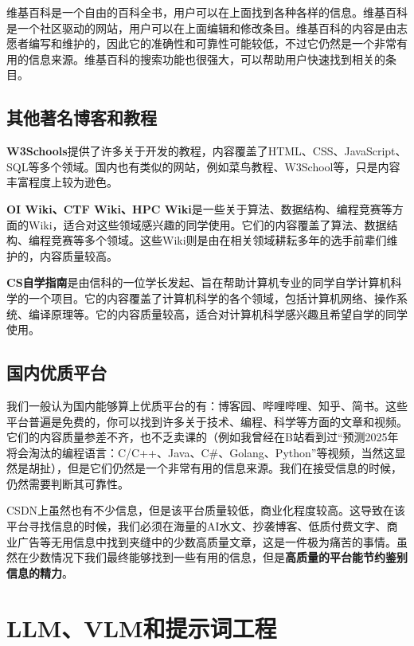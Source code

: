 \documentclass[../main.tex]{subfiles}
\begin{document}
维基百科是一个自由的百科全书，用户可以在上面找到各种各样的信息。维基百科是一个社区驱动的网站，用户可以在上面编辑和修改条目。维基百科的内容是由志愿者编写和维护的，因此它的准确性和可靠性可能较低，不过它仍然是一个非常有用的信息来源。维基百科的搜索功能也很强大，可以帮助用户快速找到相关的条目。

\subsection{其他著名博客和教程}

\textbf{W3Schools}提供了许多关于开发的教程，内容覆盖了HTML、CSS、JavaScript、SQL等多个领域。国内也有类似的网站，例如菜鸟教程、W3School等，只是内容丰富程度上较为逊色。

\textbf{OI Wiki、CTF Wiki、HPC Wiki}是一些关于算法、数据结构、编程竞赛等方面的Wiki，适合对这些领域感兴趣的同学使用。它们的内容覆盖了算法、数据结构、编程竞赛等多个领域。这些Wiki则是由在相关领域耕耘多年的选手前辈们维护的，内容质量较高。

\textbf{CS自学指南}是由信科的一位学长发起、旨在帮助计算机专业的同学自学计算机科学的一个项目。它的内容覆盖了计算机科学的各个领域，包括计算机网络、操作系统、编译原理等。它的内容质量较高，适合对计算机科学感兴趣且希望自学的同学使用。

\subsection{国内优质平台}

我们一般认为国内能够算上优质平台的有：博客园、哔哩哔哩、知乎、简书。这些平台普遍是免费的，你可以找到许多关于技术、编程、科学等方面的文章和视频。它们的内容质量参差不齐，也不乏卖课的（例如我曾经在B站看到过“预测2025年将会淘汰的编程语言：C/C++、Java、C\#、Golang、Python”等视频，当然这显然是胡扯），但是它们仍然是一个非常有用的信息来源。我们在接受信息的时候，仍然需要判断其可靠性。

\begin{tcolorbox}[title=说明]
  CSDN上虽然也有不少信息，但是该平台质量较低，商业化程度较高。这导致在该平台寻找信息的时候，我们必须在海量的AI水文、抄袭博客、低质付费文字、商业广告等无用信息中找到夹缝中的少数高质量文章，这是一件极为痛苦的事情。虽然在少数情况下我们最终能够找到一些有用的信息，但是\textbf{高质量的平台能节约鉴别信息的精力}。
\end{tcolorbox}

\section{LLM、VLM和提示词工程}
\end{document}
